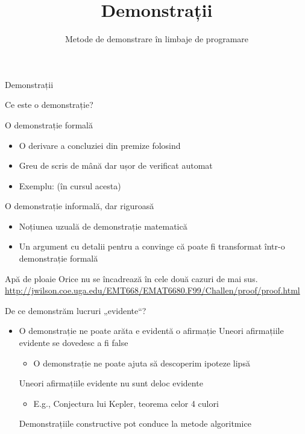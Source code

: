 \documentclass[xcolor=pdftex,romanian,colorlinks]{beamer}
\title[SLP---Demonstrații]{Demonstrații}
\subtitle{Metode de demonstrare în limbaje de programare}
\begin{document}
\begin{frame}
  \titlepage
\end{frame}

\begin{section}{Demonstrații}


\begin{frame}{Ce este o demonstrație?}
\begin{block}{O demonstrație formală}
\begin{itemize}
\item O derivare a concluziei din premize folosind 
\item Greu de scris de mână dar ușor de verificat automat
\item Exemplu: (în cursul acesta)
\end {itemize}
\end{block}
\begin{block}{O demonstrație informală, dar riguroasă}
\begin{itemize}
\item Noțiunea uzuală de demonstrație matematică
\item Un argument cu  detalii pentru a convinge că poate fi transformat într-o demonstrație formală
\end {itemize}
\end{block}
\begin{block}{Apă de ploaie}
Orice nu se încadrează în cele două cazuri de mai sus.
\url{http://jwilson.coe.uga.edu/EMT668/EMAT6680.F99/Challen/proof/proof.html}
\end {block}
\end{frame}

\begin{frame}{De ce demonstrăm lucruri „evidente“?}
\begin{itemize}
\item<1-> O demonstrație ne poate arăta  e evidentă o afirmație
 Uneori afirmațiile evidente se dovedesc a fi \alert{false}
\begin{itemize}
\item<3-> O demonstrație ne poate ajuta să descoperim ipoteze lipsă
\end{itemize}
 Uneori afirmațiile evidente nu sunt deloc evidente
\begin{itemize}
\item<4-> E.g., Conjectura lui Kepler, teorema celor 4 culori
\end{itemize}
 Demonstrațiile constructive pot conduce la metode algoritmice
\end{itemize}
\end{frame}



\end{section}
\end{document}
